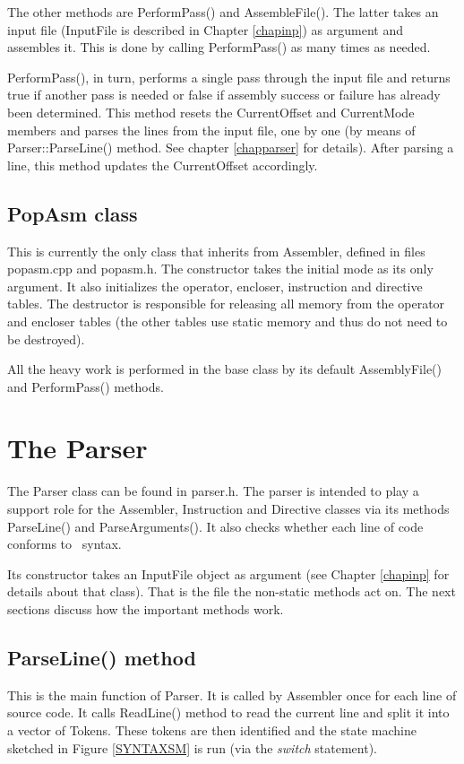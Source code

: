 \documentclass[a4paper,draft,12pt]{book}
\begin{document}
The other methods are PerformPass() and AssembleFile(). The latter takes an
input file (InputFile is described in Chapter \ref{chapinp}) as argument and
assembles it. This is done by calling PerformPass() as many times as needed.

PerformPass(), in turn, performs a single pass through the input file and
returns true if another pass is needed or false if assembly success or failure
has already been determined. This method resets the CurrentOffset and CurrentMode
members and parses the lines from the input file, one by one (by means of
Parser::ParseLine() method. See chapter \ref{chapparser} for details). After
parsing a line, this method updates the CurrentOffset accordingly.

\section{PopAsm class}
This is currently the only class that inherits from Assembler, defined in
files popasm.cpp and popasm.h. The constructor takes the initial mode as
its only argument. It also initializes the operator, encloser, instruction
and directive tables. The destructor is responsible for releasing all memory
from the operator and encloser tables (the other tables use static memory and
thus do not need to be destroyed).

All the heavy work is performed in the base class by its default AssemblyFile()
and PerformPass() methods.

\chapter{The Parser\label{chapparser}}
The Parser class can be found in parser.h. The parser is intended to play a
support role for the Assembler, Instruction and Directive classes via its
methods ParseLine() and ParseArguments(). It also checks whether each line
of code conforms to \popasm\ syntax.

Its constructor takes an InputFile object as argument (see Chapter \ref{chapinp}
for details about that class). That is the file the non-static methods act on.
The next sections discuss how the important methods work.

\section{ParseLine() method}
This is the main function of Parser. It is called by Assembler once for each line
of source code. It calls ReadLine() method to read the current line and split
it into a vector of Tokens. These tokens are then identified and the state machine
sketched in Figure \ref{SYNTAXSM} is run (via the \emph{switch} statement).
\end{document}
